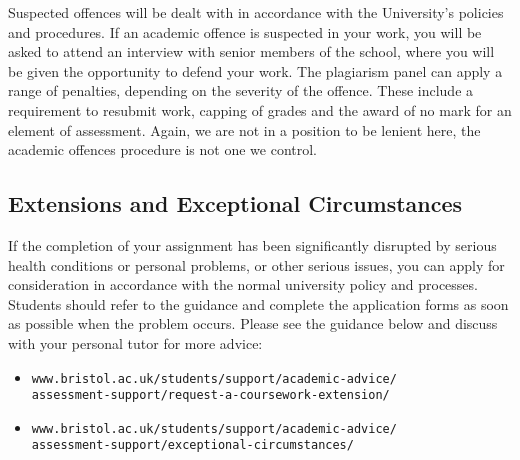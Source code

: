 \documentclass[12pt]{article}
\begin{document}
Suspected offences will be dealt with in accordance with the
University's policies and procedures. If an academic offence is
suspected in your work, you will be asked to attend an interview with
senior members of the school, where you will be given the opportunity
to defend your work. The plagiarism panel can apply a range of
penalties, depending on the severity of the offence. These include a
requirement to resubmit work, capping of grades and the award of no
mark for an element of assessment. Again, we are not in a position to
be lenient here, the academic offences procedure is not one we control.

\subsection*{Extensions and Exceptional Circumstances}

If the completion of your assignment has been significantly disrupted
by serious health conditions or personal problems, or other serious
issues, you can apply for consideration in accordance with the normal
university policy and processes. Students should refer to the guidance
and complete the application forms as soon as possible when the
problem occurs. Please see the guidance below and discuss with your
personal tutor for more advice:
\begin{itemize}
\item \texttt{www.bristol.ac.uk/students/support/academic-advice/\\
  assessment-support/request-a-coursework-extension/}
\item \texttt{www.bristol.ac.uk/students/support/academic-advice/\\assessment-support/exceptional-circumstances/}
    \end{itemize}
\end{document}
